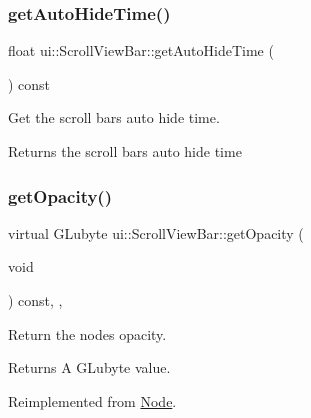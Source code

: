\subsubsection{\texorpdfstring{get\+Auto\+Hide\+Time()}{getAutoHideTime()}\hspace{0.1cm}{\footnotesize\ttfamily [2/2]}}
{\footnotesize\ttfamily float ui\+::\+Scroll\+View\+Bar\+::get\+Auto\+Hide\+Time (\begin{DoxyParamCaption}{ }\end{DoxyParamCaption}) const\hspace{0.3cm}{\ttfamily [inline]}}



Get the scroll bar\textquotesingle{}s auto hide time. 

\begin{DoxyReturn}{Returns}
the scroll bar\textquotesingle{}s auto hide time 
\end{DoxyReturn}
\mbox{\label{classui_1_1ScrollViewBar_a6c36fff342601b1ab29afaed5e4e201d}} 
\subsubsection{\texorpdfstring{get\+Opacity()}{getOpacity()}\hspace{0.1cm}{\footnotesize\ttfamily [1/2]}}
{\footnotesize\ttfamily virtual G\+Lubyte ui\+::\+Scroll\+View\+Bar\+::get\+Opacity (\begin{DoxyParamCaption}\item[{void}]{ }\end{DoxyParamCaption}) const\hspace{0.3cm}{\ttfamily [inline]}, {\ttfamily [override]}, {\ttfamily [virtual]}}

Return the node\textquotesingle{}s opacity. \begin{DoxyReturn}{Returns}
A G\+Lubyte value. 
\end{DoxyReturn}


Reimplemented from \hyperlink{classNode_ab999cce3763ea09e74014245c770ea97}{Node}.

\mbox{\label{classui_1_1ScrollViewBar_a6c36fff342601b1ab29afaed5e4e201d}} 
